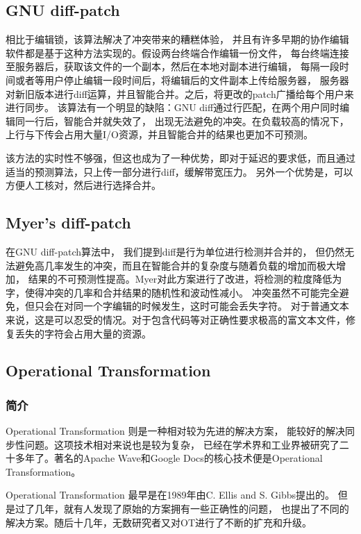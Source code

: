 \documentclass[11pt]{ctexart}
\begin{document}
\subsection{GNU diff-patch}
相比于编辑锁，该算法解决了冲突带来的糟糕体验，
并且有许多早期的协作编辑软件都是基于这种方法实现的。假设两台终端合作编辑一份文件，
每台终端连接至服务器后，获取该文件的一个副本，然后在本地对副本进行编辑，
每隔一段时间或者等用户停止编辑一段时间后，将编辑后的文件副本上传给服务器，
服务器对新旧版本进行diff运算，并且智能合并。之后，将更改的patch广播给每个用户来进行同步。
该算法有一个明显的缺陷：GNU diff通过行匹配，在两个用户同时编辑同一行后，智能合并就失效了，
出现无法避免的冲突。在负载较高的情况下，上行与下传会占用大量I/O资源，并且智能合并的结果也更加不可预测。

该方法的实时性不够强，但这也成为了一种优势，即对于延迟的要求低，而且通过适当的预测算法，只上传一部分进行diff，缓解带宽压力。
另外一个优势是，可以方便人工核对，然后进行选择合并。

\subsection{Myer's diff-patch}
在GNU diff-patch算法中，
我们提到diff是行为单位进行检测并合并的，
但仍然无法避免高几率发生的冲突，而且在智能合并的复杂度与随着负载的增加而极大增加，
结果的不可预测性提高。Myer对此方案进行了改进，将检测的粒度降低为字，使得冲突的几率和合并结果的随机性和波动性减小。
冲突虽然不可能完全避免，但只会在对同一个字编辑的时候发生，这时可能会丢失字符。
对于普通文本来说，这是可以忍受的情况。对于包含代码等对正确性要求极高的富文本文件，修复丢失的字符会占用大量的资源。


\subsection{Operational Transformation}
\subsubsection{简介}
Operational Transformation 则是一种相对较为先进的解决方案，
能较好的解决同步性问题。这项技术相对来说也是较为复杂，
已经在学术界和工业界被研究了二十多年了。著名的Apache Wave和Google Docs的核心技术便是Operational Transformation。

Operational Transformation
最早是在1989年由C. Ellis and S. Gibbs提出的。
但是过了几年，就有人发现了原始的方案拥有一些正确性的问题，
也提出了不同的解决方案。随后十几年，无数研究者又对OT进行了不断的扩充和升级。
\end{document}
